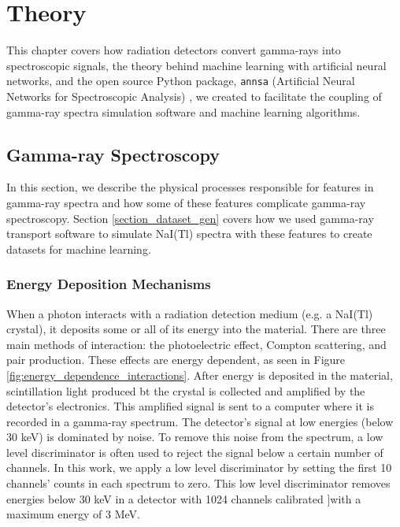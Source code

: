 \chapter{Theory} \label{theory}

This chapter covers how radiation detectors convert gamma-rays into spectroscopic signals, the theory behind machine learning with artificial neural networks, and the open source Python package, \verb|annsa| (Artificial Neural Networks for Spectroscopic Analysis) \cite{annsa}, we created to facilitate the coupling of gamma-ray spectra simulation software and machine learning algorithms.

\section{Gamma-ray Spectroscopy}

In this section, we describe the physical processes responsible for features in gamma-ray spectra and how some of these features complicate gamma-ray spectroscopy. Section \ref{section_dataset_gen} covers how we used gamma-ray transport software to simulate NaI(Tl) spectra with these features to create datasets for machine learning.


\subsection{Energy Deposition Mechanisms}

When a photon interacts with a radiation detection medium (e.g. a NaI(Tl) crystal), it deposits some or all of its energy into the material. There are three main methods of interaction: the photoelectric effect, Compton scattering, and pair production. These effects are energy dependent, as seen in Figure \ref{fig:energy_dependence_interactions}. After energy is deposited in the material, scintillation light produced bt the crystal is collected and amplified by the detector's electronics. This amplified signal is sent to a computer where it is recorded in a gamma-ray spectrum. The detector's signal at low energies (below 30 keV) is dominated by noise. To remove this noise from the spectrum, a low level discriminator is often used to reject the signal below a certain number of channels. In this work, we apply a low level discriminator by setting the first 10 channels' counts in each spectrum to zero. This low level discriminator removes energies below 30 keV in a detector with 1024 channels calibrated ]with a maximum energy of 3 MeV.

